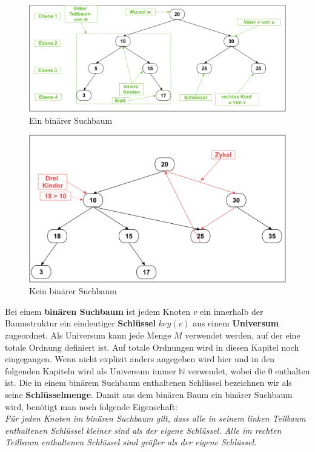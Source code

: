 \documentclass[a4paper,12pt]{article}
\begin{document}
\begin{figure}[h]
	\centering
	\includegraphics[width= 1\textwidth]{"Medien/Einleitung/ioSuchbaum"}
	\caption{Ein binärer Suchbaum }
	\label{fig:ioSuchbaum}
\end{figure}
\begin{figure}[h]
	\centering
	\includegraphics[width= 1\textwidth]{"Medien/Einleitung/nioSuchbaum"}
	\caption{Kein binärer Suchbaum }
	\label{fig:nioSuchbaum}
\end{figure}

\noindent Bei einem \textbf{binären Suchbaum} ist jedem Knoten $v$ ein innerhalb der Baumstruktur ein eindeutiger \textbf{Schlüssel} $\mathit{key}\left(v\right)$ aus einem \textbf{Universum} zugeordnet. Als Universum kann jede Menge $M$ verwendet werden, auf der eine totale Ordnung definiert ist. Auf totale Ordnungen wird in diesen Kapitel noch eingegangen. Wenn nicht explizit anders angegeben wird hier und in den folgenden Kapiteln wird als Universum immer $\mathbb{N}$ verwendet, wobei die $0$ enthalten ist. Die in einem binärem Suchbaum enthaltenen Schlüssel bezeichnen wir als seine \textbf{Schlüsselmenge}.  Damit aus dem binären Baum ein binärer Suchbaum wird, benötigt man noch folgende Eigenschaft:\\
\textit{Für jeden Knoten im binären Suchbaum gilt, dass alle in seinem linken Teilbaum enthaltenen Schlüssel kleiner sind als der eigene Schlüssel. Alle im rechten Teilbaum enthaltenen Schlüssel sind größer als der eigene Schlüssel.} \\
\end{document}
